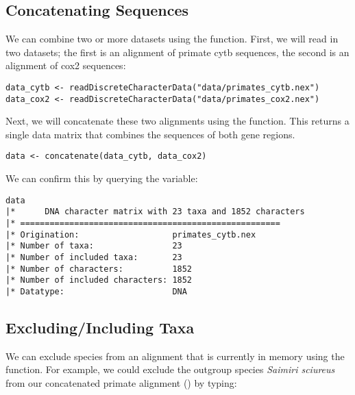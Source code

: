 
\subsection{Concatenating Sequences}
We can combine two or more datasets using the  function.
First, we will read in two datasets; the first is an alignment of primate cytb sequences, the second is an alignment of cox2 sequences:

{\tt \begin{snugshade*}
\begin{lstlisting}
data_cytb <- readDiscreteCharacterData("data/primates_cytb.nex")
data_cox2 <- readDiscreteCharacterData("data/primates_cox2.nex")
\end{lstlisting}
\end{snugshade*}}

Next, we will concatenate these two alignments using the  function. 
This returns a single data matrix that combines the sequences of both gene regions.

{\tt \begin{snugshade*}
\begin{lstlisting}
data <- concatenate(data_cytb, data_cox2)
\end{lstlisting}
\end{snugshade*}}

We can confirm this by querying the  variable: 

{\tt \begin{snugshade*}
\begin{lstlisting}
data
|*      DNA character matrix with 23 taxa and 1852 characters
|* =====================================================
|* Origination:                   primates_cytb.nex
|* Number of taxa:                23
|* Number of included taxa:       23
|* Number of characters:          1852
|* Number of included characters: 1852
|* Datatype:                      DNA
\end{lstlisting}
\end{snugshade*}}


\subsection{Excluding/Including Taxa}
We can exclude species from an alignment that is currently in memory using the  function.
For example, we could exclude the outgroup species \textit{Saimiri sciureus} from our concatenated primate alignment () by typing:

